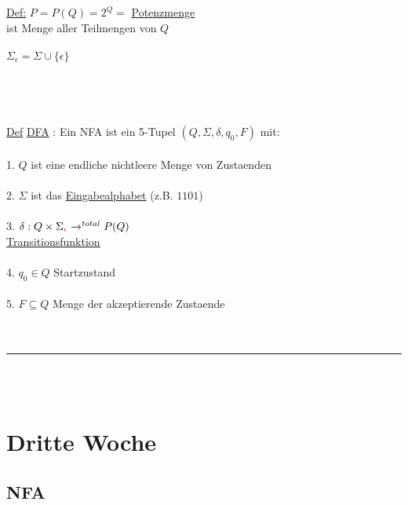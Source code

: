 \documentclass[18pt,a4paper]{scrreprt}
\newcommand{\tab}{\hspace*{2em}}
\begin{document}
\uline{Def:} \: $P = P(Q) = 2^Q =$ \uline{Potenzmenge} \\
ist Menge aller Teilmengen von $Q$ \\
\\
$\Sigma_{\epsilon} = \Sigma \cup \{\epsilon\}$\\
\\
\\
\\
\\
\uline{Def}  \uline{DFA} : Ein NFA ist ein 5-Tupel $(Q, \Sigma, \delta, q_0, F)$ mit:\\
\\
1. $Q$ ist eine endliche nichtleere Menge von Zustaenden\\
\\
2. $\Sigma$ ist das \uline{Eingabealphabet} (z.B. $1101$)\\
\\
3. $\delta : Q \times \Sigma_{\textcolor{red}{\epsilon}} \rightarrow^{total} P(Q)$\\
\tab \uline{Transitionsfunktion}\\
\\
4. $q_0 \in Q$ Startzustand\\
\\
5. $F \subseteq Q$ Menge der akzeptierende Zustaende\\
\\
\\
\rule{\textwidth}{0.4mm}\\
\\

\chapter{Dritte Woche}


\section{NFA}
\end{document}
